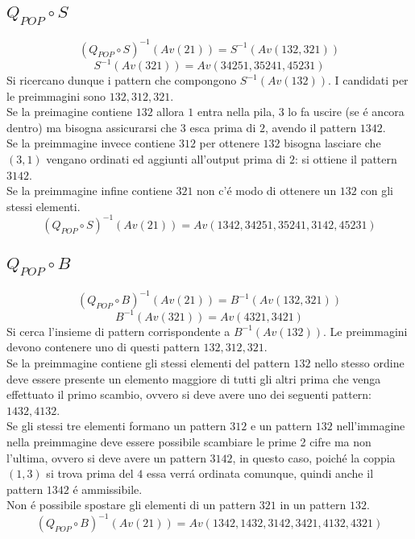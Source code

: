 \subsection*{$Q_{POP}\circ{S}$}$$(Q_{POP}\circ{S})^{-1}(Av(21))=S^{-1}(Av(132,321))$$$$S^{-1}(Av(321))=Av(34251, 35241, 45231)$$
Si ricercano dunque i pattern che compongono $S^{-1}(Av(132))$. I candidati per le preimmagini sono $132,312,321$.\\
Se la preimagine contiene $132$ allora $1$ entra nella pila, $3$ lo fa uscire (se \'e ancora dentro) ma bisogna assicurarsi che $3$ esca prima di $2$, avendo il pattern $1342$.\\
Se la preimmagine invece contiene $312$ per ottenere $132$ bisogna lasciare che $(3,1)$ vengano ordinati ed aggiunti all'output prima di $2$: si ottiene il pattern $3142$.\\
Se la preimmagine infine contiene $321$ non c'\'e modo di ottenere un $132$ con gli stessi elementi.
$$(Q_{POP}\circ{S})^{-1}(Av(21))=Av(1342, 34251, 35241, 3142, 45231)$$
\subsection*{$Q_{POP}\circ{B}$}$$(Q_{POP}\circ{B})^{-1}(Av(21))=B^{-1}(Av(132,321))$$$$B^{-1}(Av(321))=Av(4321, 3421)$$
Si cerca l'insieme di pattern corrispondente a $B^{-1}(Av(132))$. Le preimmagini devono contenere uno di questi pattern $132,312,321$.\\
Se la preimmagine contiene gli stessi elementi del pattern $132$ nello stesso ordine deve essere presente un elemento maggiore di tutti gli altri prima che venga effettuato il primo scambio, ovvero si deve avere uno dei seguenti pattern: $1432,4132$.\\
Se gli stessi tre elementi formano un pattern $312$ e un pattern $132$ nell'immagine nella preimmagine deve essere possibile scambiare le prime 2 cifre ma non l'ultima, ovvero si deve avere un pattern $3142$, in questo caso, poich\'e la coppia $(1,3)$ si trova prima del $4$ essa verr\'a ordinata comunque, quindi anche il pattern $1342$ \'e ammissibile.\\
Non \'e possibile spostare gli elementi di un pattern $321$ in un pattern $132$.
$$(Q_{POP}\circ{B})^{-1}(Av(21))=Av(1342, 1432, 3142, 3421, 4132, 4321)$$
